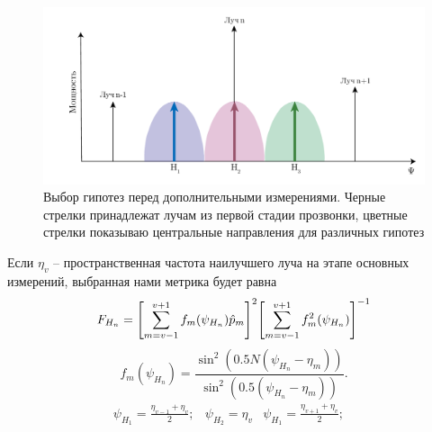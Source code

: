 \begin{figure}[ht]
    \centering
    \includegraphics[width=0.75\linewidth]{figs/fig4.13}
    \caption{Выбор гипотез перед дополнительными измерениями. Черные стрелки принадлежат лучам из первой стадии прозвонки, цветные стрелки показываю центральные направления для различных гипотез}
    \label{fig:4.13}
\end{figure}

Если $\eta_v$ --  пространственная частота наилучшего луча на этапе основных измерений, выбранная нами метрика будет равна
\begin{equation}
    \label{eq:4.34}
    F_{H_n} = \qty[\sum\limits_{m=v-1}^{v+1} f_m (\psi_{H_n}) \hat p_m]^2 \qty[\sum\limits_{m=v-1}^{v+1}f_m^2(\psi_{H_n})]^{-1}
\end{equation}
\begin{equation}
    \label{eq:4.35}
    f_m(\psi_{H_n}) = \frac{\sin^2 (0.5N(\psi_{H_n} - \eta_{m}))}{\sin^2(0.5(\psi_{H_n} - \eta_{m}))}.
\end{equation}
\begin{equation}
    \label{eq:4.36}
    \begin{matrix}
        \psi_{H_1} = \frac{\eta_{v-1} + \eta_v}{2}; &
        \psi_{H_2} = \eta_{v}                       &
        \psi_{H_1} = \frac{\eta_{v+1} + \eta_v}{2}; &
    \end{matrix}
\end{equation}


